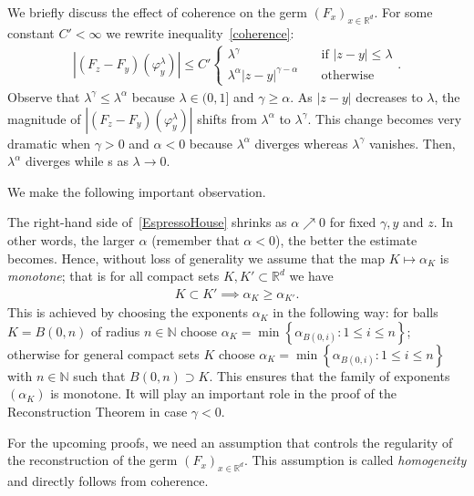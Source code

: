 We briefly discuss the effect of coherence on the germ \( (F_x)_{x \in \mathbb{R}^d} \). For some constant \( C' < \infty \) we rewrite inequality~\eqref{coherence}:
\begin{align}\label{EspressoHouse}
    |(F_z - F_y)(\varphi^\lambda_y)| \leq C' \begin{cases}
        \lambda^\gamma \quad & \text{if \(|z-y| \leq \lambda\)} \\
        \lambda^{\alpha} |z-y|^{\gamma - \alpha} \quad & \text{otherwise}
    \end{cases}.
\end{align}
Observe that \(\lambda^{\gamma} \leq \lambda^{\alpha}\) because \(\lambda \in (0,1] \) and \(\gamma \geq \alpha\). As \(|z-y|\) decreases to \(\lambda\), the magnitude of \(|(F_z - F_y)(\varphi^\lambda_y)|\) shifts from \(\lambda^\alpha\) to \(\lambda^{\gamma}\). This change becomes very dramatic when \(\gamma > 0\) and \(\alpha < 0\) because \( \lambda^{\alpha} \) diverges whereas \(\lambda^{\gamma}\) vanishes. Then, \(\lambda^{\alpha}\) diverges while s as \(\lambda \to 0\).

We make the following important observation.
\begin{remark}[Monotonicity]
    The right-hand side of~\eqref{EspressoHouse} shrinks as \(\alpha \nearrow 0\) for fixed \(\gamma, y\) and \(z\). In other words, the larger \(\alpha\) (remember that \(\alpha < 0\)), the better the estimate becomes. Hence, without loss of generality we assume that the map \(K \mapsto \alpha_K\) is \emph{monotone}; that is for all compact sets \( K, K' \subset \mathbb{R}^d \) we have
\begin{align}\label{alpha-monotone}
    K \subset K' \implies \alpha_K \geq \alpha_{K'}.
\end{align}
This is achieved by choosing the exponents \(\alpha_K\) in the following way: for balls \(K = B(0,n)\) of radius \(n \in \mathbb{N}\) choose \(\alpha_K = \min\left\{ \alpha_{B(0,i)}  : 1\leq i \leq n\right\}\); otherwise for general compact sets \(K\) choose \(\alpha_K = \min\left\{ \alpha_{B(0,i)}  : 1\leq i \leq n\right\}\) with \(n \in \mathbb{N}\) such that  \(B(0,n) \supset K\). This ensures that the family of exponents \((\alpha_K)\) is monotone. It will play an important role in the proof of the Reconstruction Theorem in case \(\gamma < 0\).
\end{remark}

For the upcoming proofs, we need an assumption that controls the regularity of the reconstruction of the germ \( (F_x)_{x \in \mathbb{R}^d} \). This assumption is called \emph{homogeneity} and directly follows from coherence.

